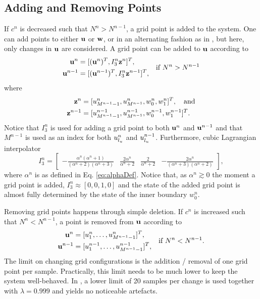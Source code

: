 \documentclass[fleqn]{jaes}
\begin{document}
\subsection{Adding and Removing Points}\label{sec:addRemove}
If $c^n$ is decreased such that $N^n > N^{n-1}$, a grid point is added to the system. One can add points to either $\mathbf{u}$ or $\mathbf{w}$, or in an alternating fashion as in \cite{Willemsen2021a}, but here, only changes in $\mathbf{u}$ are considered. A grid point can be added to $\mathbf{u}$ according to
\begin{equation}
\begin{aligned}
    \u^n &= [(\u^n)^T, I_3^n\z^n]^T,\\
    \u^{n-1} &= [(\u^{n-1})^T, I_3^n\z^{n-1}]^T,\\
\end{aligned} \quad \text{if } N^n > N^{n-1}
\end{equation}
where
\begin{equation*}
    \begin{aligned}
        \z^n &= [u_{M^{n-1}-1}^n, u_{M^{n-1}}^n, w_0^n, w_1^n]^T, \quad \text{and}\\
        \z^{n-1} &= [u_{M^{n-1}-1}^{n-1}, u_{M^{n-1}}^{n-1}, w_0^{n-1}, w_1^{n-1}]^T.
    \end{aligned}
\end{equation*}
Notice that $I_3^n$ is used for adding a grid point to both $\mathbf{u}^n$ and $\mathbf{u}^{n-1}$ and that $M^{n-1}$ is used as an index for both $u^n_{l_u}$ and $u^{n-1}_{l_u}$.
Furthermore, cubic Lagrangian interpolator
\begin{equation}\label{eq:customIp}
    I_3^n = \begin{bmatrix} -\frac{\alpha^n(\alpha^n+1)}{(\alpha^n+2)(\alpha^n+3)} &\frac{2\alpha^n}{\alpha^n+2} &\frac{2}{\alpha^n+2} 
    &-\frac{2\alpha^n}{(\alpha^n+3)(\alpha^n+2)}
    \end{bmatrix},
\end{equation}
where $\alpha^n$ is as defined in Eq. \eqref{eq:alphaDef}. Notice that, as $\alpha^n \gtrsim 0$ the moment a grid point is added, $I_3^n\approx [0, 0, 1, 0]$ and the state of the added grid point is almost fully determined by the state of the inner boundary $w_0^n$. 

Removing grid points happens through simple deletion. If $c^n$ is increased such that $N^n < N^{n-1}$, a point is removed from $\mathbf{u}$ according to
\begin{equation}
\begin{aligned}
    \u^n &= [u_1^n, \hdots, u_{M^{n-1}-1}^n]^T,\\
    \u^{n-1} &= [u_1^{n-1}, \hdots, u_{M^{n-1}-1}^{n-1}]^T,
    \end{aligned} \quad \text{if } N^n < N^{n-1}.
\end{equation}
The limit on changing grid configurations is the addition / removal of one grid point per sample. Practically, this limit needs to be much lower to keep the system well-behaved. In \cite{Willemsen2021b}, a lower limit of 20 samples per change is used together with $\lambda = 0.999$ and yields no noticeable artefacts.
\end{document}
